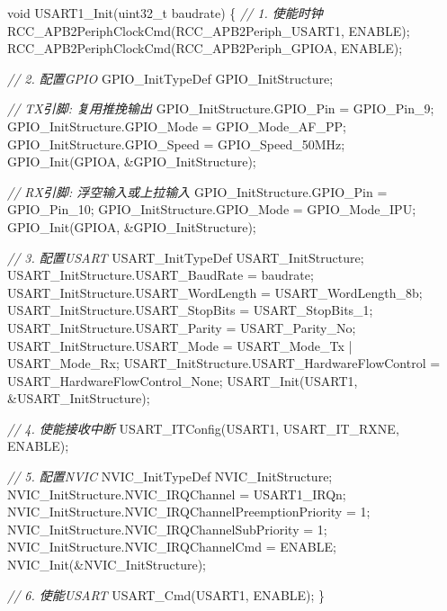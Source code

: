 \documentclass[
]{article}
\newenvironment{Shaded}{}{}
\newcommand{\CommentTok}[1]{\textcolor[rgb]{0.38,0.63,0.69}{\textit{#1}}}
\newcommand{\DataTypeTok}[1]{\textcolor[rgb]{0.56,0.13,0.00}{#1}}
\newcommand{\DecValTok}[1]{\textcolor[rgb]{0.25,0.63,0.44}{#1}}
\newcommand{\NormalTok}[1]{#1}
\begin{document}
\begin{Shaded}
\begin{Highlighting}[]
\DataTypeTok{void}\NormalTok{ USART1\_Init(}\DataTypeTok{uint32\_t}\NormalTok{ baudrate)}
\NormalTok{\{}
    \CommentTok{// 1. 使能时钟}
\NormalTok{    RCC\_APB2PeriphClockCmd(RCC\_APB2Periph\_USART1, ENABLE);}
\NormalTok{    RCC\_APB2PeriphClockCmd(RCC\_APB2Periph\_GPIOA, ENABLE);}
    
    \CommentTok{// 2. 配置GPIO}
\NormalTok{    GPIO\_InitTypeDef GPIO\_InitStructure;}
    
    \CommentTok{// TX引脚: 复用推挽输出}
\NormalTok{    GPIO\_InitStructure.GPIO\_Pin = GPIO\_Pin\_9;}
\NormalTok{    GPIO\_InitStructure.GPIO\_Mode = GPIO\_Mode\_AF\_PP;}
\NormalTok{    GPIO\_InitStructure.GPIO\_Speed = GPIO\_Speed\_50MHz;}
\NormalTok{    GPIO\_Init(GPIOA, \&GPIO\_InitStructure);}
    
    \CommentTok{// RX引脚: 浮空输入或上拉输入}
\NormalTok{    GPIO\_InitStructure.GPIO\_Pin = GPIO\_Pin\_10;}
\NormalTok{    GPIO\_InitStructure.GPIO\_Mode = GPIO\_Mode\_IPU;}
\NormalTok{    GPIO\_Init(GPIOA, \&GPIO\_InitStructure);}
    
    \CommentTok{// 3. 配置USART}
\NormalTok{    USART\_InitTypeDef USART\_InitStructure;}
\NormalTok{    USART\_InitStructure.USART\_BaudRate = baudrate;}
\NormalTok{    USART\_InitStructure.USART\_WordLength = USART\_WordLength\_8b;}
\NormalTok{    USART\_InitStructure.USART\_StopBits = USART\_StopBits\_1;}
\NormalTok{    USART\_InitStructure.USART\_Parity = USART\_Parity\_No;}
\NormalTok{    USART\_InitStructure.USART\_Mode = USART\_Mode\_Tx | USART\_Mode\_Rx;}
\NormalTok{    USART\_InitStructure.USART\_HardwareFlowControl = USART\_HardwareFlowControl\_None;}
\NormalTok{    USART\_Init(USART1, \&USART\_InitStructure);}
    
    \CommentTok{// 4. 使能接收中断}
\NormalTok{    USART\_ITConfig(USART1, USART\_IT\_RXNE, ENABLE);}
    
    \CommentTok{// 5. 配置NVIC}
\NormalTok{    NVIC\_InitTypeDef NVIC\_InitStructure;}
\NormalTok{    NVIC\_InitStructure.NVIC\_IRQChannel = USART1\_IRQn;}
\NormalTok{    NVIC\_InitStructure.NVIC\_IRQChannelPreemptionPriority = }\DecValTok{1}\NormalTok{;}
\NormalTok{    NVIC\_InitStructure.NVIC\_IRQChannelSubPriority = }\DecValTok{1}\NormalTok{;}
\NormalTok{    NVIC\_InitStructure.NVIC\_IRQChannelCmd = ENABLE;}
\NormalTok{    NVIC\_Init(\&NVIC\_InitStructure);}
    
    \CommentTok{// 6. 使能USART}
\NormalTok{    USART\_Cmd(USART1, ENABLE);}
\NormalTok{\}}
\end{Highlighting}
\end{Shaded}
\end{document}
